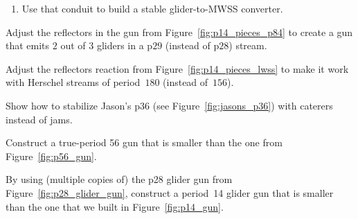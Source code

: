 \begin{multicols}{2}
\begin{problem}
\begin{enumerate}[label=\bf\color{ocre}(\alph*)]
			\item Use that conduit to build a stable glider-to-MWSS converter.
		\end{enumerate}
	\end{problem}
	
	
	\mfilbreak
	
	
	\begin{problem}\label{exer:p28_adjust_29} 
		Adjust the reflectors in the gun from Figure~\ref{fig:p14_pieces_p84} to create a gun that emits $2$ out of $3$ gliders in a p$29$ (instead of p$28$) stream.
	\end{problem}
	
	
	\mfilbreak
	
	
	\begin{problem}\label{exer:p156_adjust_lwss} 
		Adjust the reflectors reaction from Figure~\ref{fig:p14_pieces_lwss} to make it work with Herschel streams of period~$180$ (instead of~$156$).
	\end{problem}
	
	
	\mfilbreak
	
	
	\begin{problem}\label{exer:jasons_p36_caterer} 
		Show how to stabilize Jason's p$36$ (see Figure~\ref{fig:jasons_p36}) with caterers instead of jams.
	\end{problem}
	
	
	\mfilbreak
	
	
	\begin{problem}\label{exer:p56_gun_smaller} 
		Construct a true-period 56 gun that is smaller than the one from Figure~\ref{fig:p56_gun}.
		
	\end{problem}
	
	
	\mfilbreak
	
	
	\begin{problem}\label{exer:smaller_p14_gun} 
		By using (multiple copies of) the p28 glider gun from Figure~\ref{fig:p28_glider_gun}, construct a period~14 glider gun that is smaller than the one that we built in Figure~\ref{fig:p14_gun}.
	\end{problem}
	

\end{multicols}
